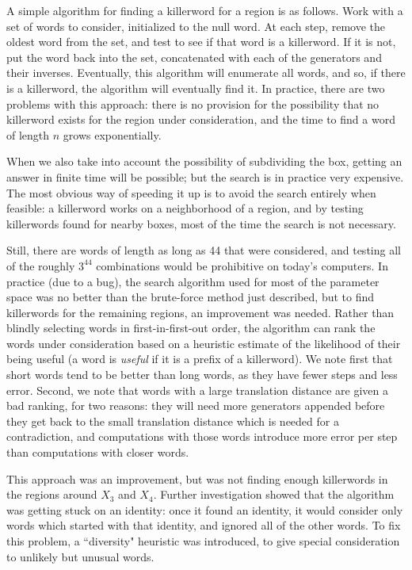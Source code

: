 A simple algorithm for finding a killerword for a region is as follows.
Work with a set of words to consider, initialized to the null word.  At 
each step, remove the oldest word from the set, and test to see if that 
word is a killerword.
If it is not, put the word back into the set, concatenated with each of 
the generators and their inverses.
Eventually, this algorithm will enumerate all words, and so, if there 
is a killerword, the algorithm will eventually find it.  In practice, 
there are two problems with this approach: there is no provision for the possibility that no killerword exists for the region under consideration, 
and the time to find a word of length $n$ grows exponentially.

When we also take into account the possibility of subdividing the box, getting an answer in finite time will be possible; but the search is in practice 
very expensive.  The most obvious way of speeding it up is to avoid 
the search entirely when feasible: a killerword works on a neighborhood of a 
region, and by testing killerwords found for nearby boxes, most of 
the time the search is not necessary.

Still, there are words of length as long as 44 that were considered, and testing all of the roughly $3^{44}$ 
combinations would be prohibitive on today's computers.  In practice 
(due to a bug), the search algorithm used for most of the parameter
space was no better than the brute-force method just described, but to find 
killerwords for the remaining regions, an improvement was needed.  
Rather than blindly selecting words in first-in-first-out order, 
the algorithm can
rank the words under consideration based on a heuristic estimate of 
the likelihood of their being useful (a word is {\it useful} if it is a prefix of a killerword).  
We note first that short words tend to be better than 
long words, as they have fewer steps and less error.
Second, we note that words 
with a large translation distance are given a bad ranking, for two reasons: 
they will need more generators appended before they get back to the 
small translation distance which is needed for a contradiction, and
 computations with those words introduce more error per step than 
computations with closer words.  

This approach was an improvement, but was not finding enough killerwords in the regions 
around $X_3$ and $X_4$.  Further investigation showed that the 
algorithm was getting stuck on an identity: once it found an identity, 
it would consider only words which started with that identity, and 
ignored all of the other words.  To fix this problem, a ``diversity" 
heuristic was introduced, to give special consideration to unlikely but 
unusual words.

